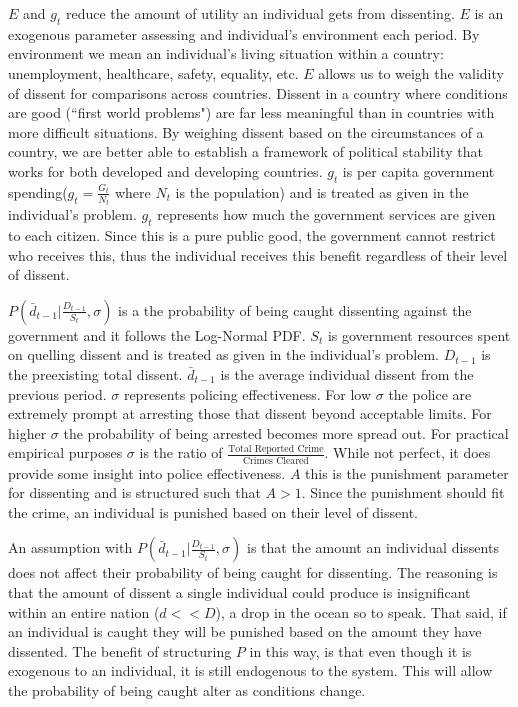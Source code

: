 \documentclass[12pt]{article}
\begin{document}
\begin{spacing}{1.5}
$E$ and $g_t$ reduce the amount of utility an individual gets from dissenting. $E$ is an exogenous parameter assessing and individual's environment each period. By environment we mean an individual's living situation within a country: unemployment, healthcare, safety, equality, etc. $E$ allows us to weigh the validity of dissent for comparisons across countries. Dissent in a country where conditions are good (``first world problems") are far less meaningful than in countries with more difficult situations. By weighing dissent based on the circumstances of a country, we are better able to establish a framework of political stability that works for both developed and developing countries. $g_t$ is per capita government spending($g_t=\frac{G_t}{N_t}$ where $N_t$ is the population) and is treated as given in the individual's problem. $g_t$ represents how much the government services are given to each citizen. Since this is a pure public good, the government cannot restrict who receives this, thus the individual receives this benefit regardless of their level of dissent. 

$ P \left( \bar{d}_{t-1} \Bigg|\frac{D_{t-1}}{S_t},\sigma \right)$ is a the probability of being caught dissenting against the government and it follows the Log-Normal PDF. $S_t$ is government resources spent on quelling dissent and is treated as given in the individual's problem. $D_{t-1}$ is the preexisting total dissent. $\bar{d}_{t-1}$ is the average individual dissent from the previous period. $\sigma$ represents policing effectiveness. For low $\sigma$ the police are extremely prompt at arresting those that dissent beyond acceptable limits. For higher $\sigma$ the probability of being arrested becomes more spread out. For practical empirical purposes $\sigma$ is the ratio of $\frac{\text{Total Reported Crime}}{\text{Crimes Cleared}}$. While not perfect, it does provide some insight into police effectiveness. $A$ this is the punishment parameter for dissenting and is structured such that $A>1$. Since the punishment should fit the crime, an individual is punished based on their level of dissent. 

An assumption with $P \left( \bar{d}_{t-1} \Bigg|\frac{D_{t-1}}{S_t},\sigma \right)$ is that the amount an individual dissents does not affect their probability of being caught for dissenting. The reasoning is that the amount of dissent a single individual could produce is insignificant within an entire nation ($d<<D$), a drop in the ocean so to speak. That said, if an individual is caught they will be punished based on the amount they have dissented. The benefit of structuring $P$ in this way, is that even though it is exogenous to an individual, it is still endogenous to the system. This will allow the probability of being caught alter as conditions change.   




\end{spacing}
\end{document}
